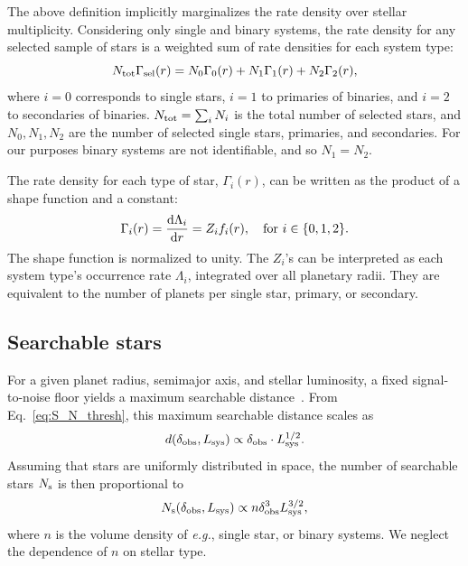 \documentclass[12pt,modern]{aastex61}
\newcommand{\s}{_{\rm s}}
\begin{document}
The above definition implicitly marginalizes the rate density over stellar 
multiplicity.
Considering only single and binary systems, the rate density for any selected 
sample of stars is a weighted sum of rate densities for each system type:
\begin{equation}
N_{\rm tot} \Gamma_{\rm sel}(r) =
N_0 \Gamma_0(r) +
N_1 \Gamma_1(r) +
N_2 \Gamma_2(r),
\label{eq:rate_density_marginalized}
\end{equation}
where $i=0$ corresponds to single stars, $i=1$ to primaries of 
binaries, and $i=2$ to secondaries of binaries.
$N_{\rm tot} = \sum_i N_i$ is the total number of selected stars, and 
$N_0,N_1,N_2$ are the number of selected single stars, primaries, and 
secondaries. For our purposes binary systems are not identifiable, and so 
$N_1=N_2$.

The rate density for each type of star, $\Gamma_i(r)$, can be written as 
the product of a shape function and a constant:
\begin{equation}
\Gamma_i(r) = \frac{{\rm d}\Lambda_i}{{\rm d}r} = Z_i f_i(r),
\quad {\rm for}\ i\in\{0,1,2\}.
\label{eq:rate_density_shape}
\end{equation}
The shape function is normalized to unity.
The $Z_i$'s can be interpreted as each system type's occurrence rate 
$\Lambda_i$, integrated over all planetary radii.
They are equivalent to the number of planets per single star, primary, or 
secondary.

\subsection{Searchable stars}
For a given planet radius, semimajor axis, and stellar luminosity, a fixed 
signal-to-noise floor yields a maximum searchable 
distance~\citep{pepper_using_2003,pepper_searching_2005}.
From Eq.~\ref{eq:S_N_thresh}, this maximum searchable distance scales as
\begin{equation}
d(\delta_{\rm obs}, L_{\rm sys}) \propto \delta_{\rm obs} \cdot L_{\rm 
    sys}^{1/2}.
\end{equation}
Assuming that stars are uniformly distributed in space, the number 
of searchable stars $N\s$ is then proportional to
\begin{equation}
N\s(\delta_{\rm obs}, L_{\rm sys}) \propto n \delta_{\rm obs}^3 L_{\rm 
    sys}^{3/2},
\label{eq:N_searchable_prop}
\end{equation}
where $n$ is the volume density of {\it e.g.}, single star, or binary systems.
We neglect the dependence of $n$ on stellar type.
\end{document}
